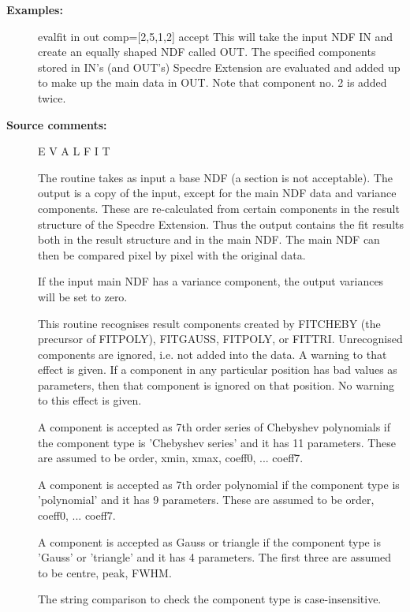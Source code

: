 \begin{description}
\begin{description}
\item [\textbf{Examples:}]
\begin{terminalv}
evalfit in out comp=[2,5,1,2] accept
   This will take the input NDF IN and create an equally shaped
   NDF called OUT. The specified components stored in IN's (and
   OUT's) Specdre Extension are evaluated and added up to make up
   the main data in OUT. Note that component no. 2 is added twice.

\end{terminalv}

\item [\textbf{Source comments:}]
\begin{terminalv}
   E V A L F I T

   The routine takes as input a base NDF (a section is not
   acceptable). The output is a copy of the input, except for the
   main NDF data and variance components. These are re-calculated from
   certain components in the result structure of the Specdre
   Extension. Thus the output contains the fit results both in the
   result structure and in the main NDF. The main NDF can then be
   compared pixel by pixel with the original data.

   If the input main NDF has a variance component, the output
   variances will be set to zero.

   This routine recognises result components created by FITCHEBY (the
   precursor of FITPOLY), FITGAUSS, FITPOLY, or FITTRI. Unrecognised
   components are ignored, i.e. not added into the data. A warning to
   that effect is given.
   If a component in any particular position has bad values as
   parameters, then that component is ignored on that position. No
   warning to this effect is given.

   A component is accepted as 7th order series of Chebyshev
   polynomials if the component type is 'Chebyshev series' and it has
   11 parameters. These are assumed to be order, xmin, xmax, coeff0,
   ... coeff7.

   A component is accepted as 7th order polynomial if the component
   type is 'polynomial' and it has 9 parameters. These are assumed to
   be order, coeff0, ... coeff7.

   A component is accepted as Gauss or triangle if the component type
   is 'Gauss' or 'triangle' and it has 4 parameters. The first three
   are assumed to be centre, peak, FWHM.

   The string comparison to check the component type is
   case-insensitive.


\end{terminalv}
\end{description}
\end{description}
